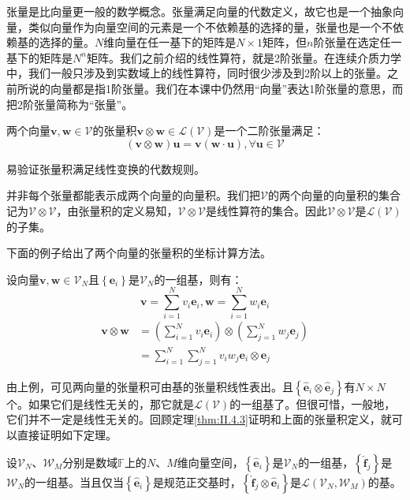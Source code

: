 \documentclass[main.tex]{subfiles}
\begin{document}
张量是比向量更一般的数学概念。张量满足向量的代数定义，故它也是一个抽象向量，类似向量作为向量空间的元素是一个不依赖基的选择的量，张量也是一个不依赖基的选择的量。$N$维向量在任一基下的矩阵是$N\times 1$矩阵，但$n$阶张量在选定任一基下的矩阵是$N^n$矩阵。我们之前介绍的线性算符，就是2阶张量。在连续介质力学中，我们一般只涉及到实数域上的线性算符，同时很少涉及到2阶以上的张量。之前所说的向量都是指1阶张量。我们在本课中仍然用“向量”表达1阶张量的意思，而把2阶张量简称为“张量”。

\begin{definition}[两个向量的张量积]
两个向量$\mathbf{v},\mathbf{w}\in\mathcal{V}$的张量积$\mathbf{v}\otimes\mathbf{w}\in\mathcal{L}\left(\mathcal{V}\right)$是一个二阶张量满足：
\[\left(\mathbf{v}\otimes\mathbf{w}\right)\mathbf{u}=\mathbf{v}\left(\mathbf{w}\cdot\mathbf{u}\right),\forall\mathbf{u}\in\mathcal{V}\]
\end{definition}

易验证张量积满足线性变换的代数规则。

并非每个张量都能表示成两个向量的向量积。我们把$\mathcal{V}$的两个向量的向量积的集合记为$\mathcal{V}\otimes\mathcal{V}$，由张量积的定义易知，$\mathcal{V}\otimes\mathcal{V}$是线性算符的集合。因此$\mathcal{V}\otimes\mathcal{V}$是$\mathcal{L}\left(\mathcal{V}\right)$的子集。

下面的例子给出了两个向量的张量积的坐标计算方法。

\begin{example}
设向量$\mathbf{v},\mathbf{w}\in\mathcal{V}_N$且$\left\{\mathbf{e}_i\right\}$是$\mathcal{V}_N$的一组基，则有：
\[\mathbf{v}=\sum_{i=1}^Nv_i\mathbf{e}_i,\mathbf{w}=\sum_{i=1}^Nw_i\mathbf{e}_i\]
\begin{align*}
\mathbf{v}\otimes\mathbf{w}&=\left(\sum_{i=1}^Nv_i\mathbf{e}_i\right)\otimes\left(\sum_{j=1}^Nw_j\mathbf{e}_j\right)\\&=\sum_{i=1}^N\sum_{j=1}^Nv_iw_j\mathbf{e}_i\otimes\mathbf{e}_j
\end{align*}
\end{example}

由上例，可见两向量的张量积可由基的张量积线性表出。且$\left\{\mathbf{\hat{e}}_i\otimes\mathbf{\hat{e}}_j\right\}$有$N\times N$个。如果它们是线性无关的，那它就是$\mathcal{L}\left(\mathcal{V}\right)$的一组基了。但很可惜，一般地，它们并不一定是线性无关的。回顾定理\ref{thm:II.4.3}证明和上面的张量积定义，就可以直接证明如下定理。

\begin{theorem}
设$\mathcal{V}_N$、$\mathcal{W}_M$分别是数域$\mathbb{F}$上的$N$、$M$维向量空间，$\left\{\mathbf{\hat{e}}_i\right\}$是$\mathcal{V}_N$的一组基，$\left\{\mathbf{\hat{f}}_j\right\}$是$\mathcal{W}_N$的一组基。当且仅当$\left\{\mathbf{\hat{e}}_i\right\}$是规范正交基时，$\left\{\mathbf{\hat{f}}_j\otimes\mathbf{\hat{e}}_i\right\}$是$\mathcal{L}\left(\mathcal{V}_N,\mathcal{W}_M\right)$的基。
\end{theorem}
\end{document}
